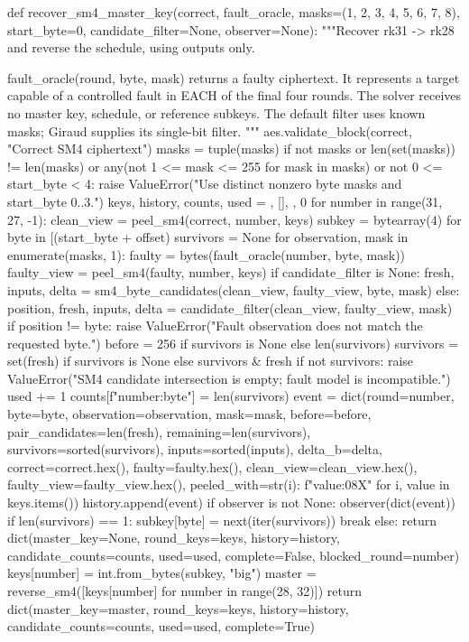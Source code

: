 \begin{lightcode}[numbers=left,firstnumber=1]
def recover_sm4_master_key(correct, fault_oracle, masks=(1, 2, 3, 4, 5, 6, 7, 8), start_byte=0, candidate_filter=None, observer=None):
    """Recover rk31 -> rk28 and reverse the schedule, using outputs only.

    fault_oracle(round, byte, mask) returns a faulty ciphertext. It represents
    a target capable of a controlled fault in EACH of the final four rounds.
    The solver receives no master key, schedule, or reference subkeys.
    The default filter uses known masks; Giraud supplies its single-bit filter.
    """
    aes.validate_block(correct, "Correct SM4 ciphertext")
    masks = tuple(masks)
    if not masks or len(set(masks)) != len(masks) or any(not 1 <= mask <= 255 for mask in masks) or not 0 <= start_byte < 4:
        raise ValueError("Use distinct nonzero byte masks and start_byte 0..3.")
    keys, history, counts, used = {}, [], {}, 0
    for number in range(31, 27, -1):
        clean_view = peel_sm4(correct, number, keys)
        subkey = bytearray(4)
        for byte in [(start_byte + offset) %
            survivors = None
            for observation, mask in enumerate(masks, 1):
                faulty = bytes(fault_oracle(number, byte, mask))
                faulty_view = peel_sm4(faulty, number, keys)
                if candidate_filter is None:
                    fresh, inputs, delta = sm4_byte_candidates(clean_view, faulty_view, byte, mask)
                else:
                    position, fresh, inputs, delta = candidate_filter(clean_view, faulty_view, mask)
                    if position != byte:
                        raise ValueError("Fault observation does not match the requested byte.")
                before = 256 if survivors is None else len(survivors)
                survivors = set(fresh) if survivors is None else survivors & fresh
                if not survivors:
                    raise ValueError("SM4 candidate intersection is empty; fault model is incompatible.")
                used += 1
                counts[f"{number}:{byte}"] = len(survivors)
                event = dict(round=number, byte=byte, observation=observation, mask=mask, before=before, pair_candidates=len(fresh), remaining=len(survivors), survivors=sorted(survivors), inputs=sorted(inputs), delta_b=delta, correct=correct.hex(), faulty=faulty.hex(), clean_view=clean_view.hex(), faulty_view=faulty_view.hex(), peeled_with={str(i): f"{value:08X}" for i, value in keys.items()})
                history.append(event)
                if observer is not None:
                    observer(dict(event))
                if len(survivors) == 1:
                    subkey[byte] = next(iter(survivors))
                    break
            else:
                return dict(master_key=None, round_keys=keys, history=history, candidate_counts=counts, used=used, complete=False, blocked_round=number)
        keys[number] = int.from_bytes(subkey, "big")
    master = reverse_sm4([keys[number] for number in range(28, 32)])
    return dict(master_key=master, round_keys=keys, history=history, candidate_counts=counts, used=used, complete=True)




\end{lightcode}
